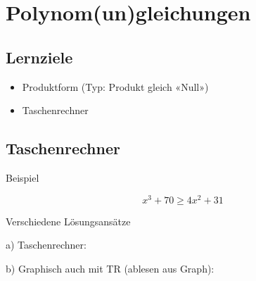 
\section{Polynom(un)gleichungen}


\subsection*{Lernziele}

\begin{itemize}
\item Produktform (Typ: Produkt gleich «Null»)
\item Taschenrechner
\end{itemize}

\newpage


\newpage

\newpage

\subsection{Taschenrechner}
Beispiel

$$x^3 + 70 \ge{} 4x^2 + 31$$

Verschiedene Lösungsansätze



a) Taschenrechner: 

\leserluft{}

b) Graphisch auch mit TR (ablesen aus Graph):

